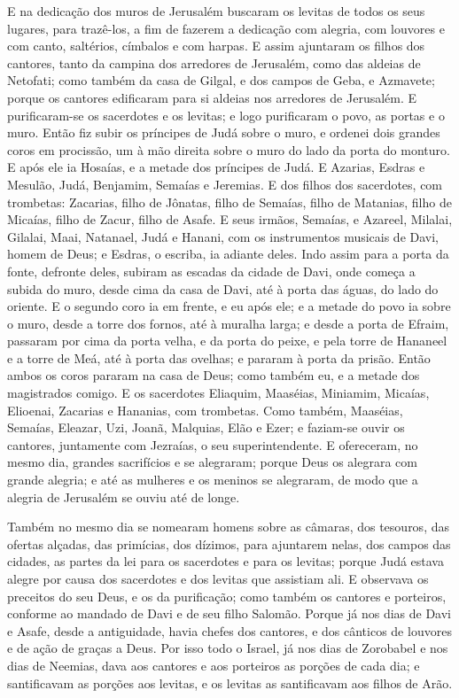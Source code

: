 E na dedicação dos muros de Jerusalém buscaram os levitas de
todos os seus lugares, para trazê-los, a fim de fazerem a dedicação
com alegria, com louvores e com canto, saltérios, címbalos e com
harpas. E assim ajuntaram os filhos dos cantores, tanto da
campina dos arredores de Jerusalém, como das aldeias de Netofati;
como também da casa de Gilgal, e dos campos de Geba, e
Azmavete; porque os cantores edificaram para si aldeias nos
arredores de Jerusalém. E purificaram-se os sacerdotes e os
levitas; e logo purificaram o povo, as portas e o muro. Então
fiz subir os príncipes de Judá sobre o muro, e ordenei dois grandes
coros em procissão, um à mão direita sobre o muro do lado da porta
do monturo. E após ele ia Hosaías, e a metade dos príncipes
de Judá. E Azarias, Esdras e Mesulão, Judá, Benjamim,
Semaías e Jeremias. E dos filhos dos sacerdotes, com
trombetas: Zacarias, filho de Jônatas, filho de Semaías, filho de
Matanias, filho de Micaías, filho de Zacur, filho de Asafe. E
seus irmãos, Semaías, e Azareel, Milalai, Gilalai, Maai, Natanael,
Judá e Hanani, com os instrumentos musicais de Davi, homem de Deus;
e Esdras, o escriba, ia adiante deles. Indo assim para a
porta da fonte, defronte deles, subiram as escadas da cidade de
Davi, onde começa a subida do muro, desde cima da casa de Davi, até
à porta das águas, do lado do oriente. E o segundo coro ia em
frente, e eu após ele; e a metade do povo ia sobre o muro, desde a
torre dos fornos, até à muralha larga; e desde a porta de
Efraim, passaram por cima da porta velha, e da porta do peixe, e
pela torre de Hananeel e a torre de Meá, até à porta das ovelhas; e
pararam à porta da prisão. Então ambos os coros pararam na
casa de Deus; como também eu, e a metade dos magistrados comigo.
E os sacerdotes Eliaquim, Maaséias, Miniamim, Micaías,
Elioenai, Zacarias e Hananias, com trombetas. Como também,
Maaséias, Semaías, Eleazar, Uzi, Joanã, Malquias, Elão e Ezer; e
faziam-se ouvir os cantores, juntamente com Jezraías, o seu
superintendente. E ofereceram, no mesmo dia, grandes
sacrifícios e se alegraram; porque Deus os alegrara com grande
alegria; e até as mulheres e os meninos se alegraram, de modo que a
alegria de Jerusalém se ouviu até de longe.

Também no mesmo dia se nomearam homens sobre as câmaras, dos
tesouros, das ofertas alçadas, das primícias, dos dízimos, para
ajuntarem nelas, dos campos das cidades, as partes da lei para os
sacerdotes e para os levitas; porque Judá estava alegre por causa
dos sacerdotes e dos levitas que assistiam ali. E observava
os preceitos do seu Deus, e os da purificação; como também os
cantores e porteiros, conforme ao mandado de Davi e de seu filho
Salomão. Porque já nos dias de Davi e Asafe, desde a
antiguidade, havia chefes dos cantores, e dos cânticos de louvores e
de ação de graças a Deus. Por isso todo o Israel, já nos dias
de Zorobabel e nos dias de Neemias, dava aos cantores e aos
porteiros as porções de cada dia; e santificavam as porções aos
levitas, e os levitas as santificavam aos filhos de Arão.

